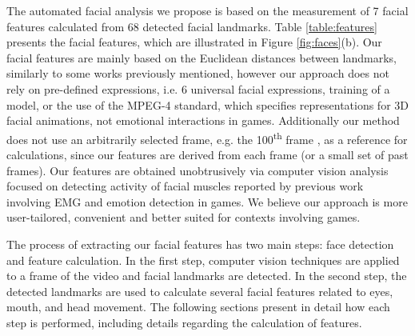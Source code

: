 The automated facial analysis we propose is based on the measurement of 7 facial features calculated from 68 detected facial landmarks. Table \ref{table:features} presents the facial features, which are illustrated in Figure \ref{fig:faces}(b). Our facial features are mainly based on the Euclidean distances between landmarks, similarly to some works previously mentioned, however our approach does not rely on pre-defined expressions, i.e. 6 universal facial expressions, training of a model, or the use of the MPEG-4 standard, which specifies representations for 3D facial animations, not emotional interactions in games. Additionally our method does not use an arbitrarily selected frame, e.g. the 100\textsuperscript{th} frame \cite{giannakakis2017stress}, as a reference for calculations, since our features are derived from each frame (or a small set of past frames). Our features are obtained unobtrusively via computer vision analysis focused on detecting activity of facial muscles reported by previous work involving EMG and emotion detection in games. We believe our approach is more user-tailored, convenient and better suited for contexts involving games.

The process of extracting our facial features has two main steps: face detection and feature calculation. In the first step, computer vision techniques are applied to a frame of the video and facial landmarks are detected. In the second step, the detected landmarks are used to calculate several facial features related to eyes, mouth, and head movement. The following sections present in detail how each step is performed, including details regarding the calculation of features.


